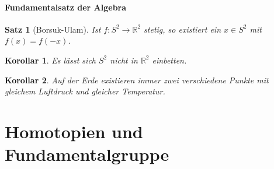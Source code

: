 \documentclass[a4paper,11pt,notitlepage]{report}
\newtheorem{theorem}{Satz}[chapter]
\newtheorem{corollary}{Korollar}[chapter]
\newcommand{\R}{{\ensuremath{\mathbb{R}}}}
\begin{document}
\paragraph{Fundamentalsatz der Algebra}

\begin{theorem}[Borsuk-Ulam]
	Ist $f \colon S^2 \rightarrow \R^2$ stetig, so existiert ein $x \in S^2$ mit $f(x) = f(-x)$.
\end{theorem}

\begin{corollary}
	Es lässt sich $S^2$ nicht in $\R^2$ einbetten.
\end{corollary}

\begin{corollary}
	Auf der Erde existieren immer zwei verschiedene Punkte mit gleichem Luftdruck und gleicher Temperatur.	
\end{corollary}

\section{Homotopien und Fundamentalgruppe}
\end{document}
